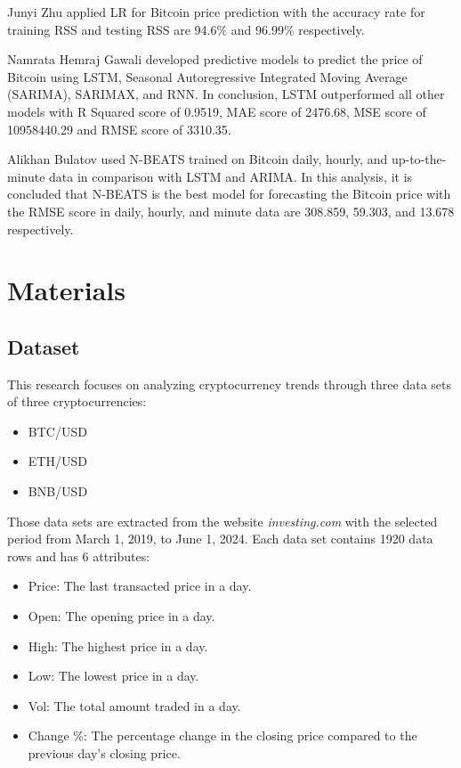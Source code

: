 \documentclass{ieeeojies}
\begin{document}
Junyi Zhu \cite{b3} applied LR for Bitcoin price prediction with the accuracy rate for training RSS and testing RSS are 94.6\% and 96.99\% respectively.\newline

Namrata Hemraj Gawali \cite{b4} developed predictive models to predict the price of Bitcoin using LSTM, Seasonal Autoregressive Integrated Moving Average (SARIMA), SARIMAX, and RNN. In conclusion, LSTM outperformed all other models with R Squared score of 0.9519, MAE score of 2476.68, MSE score of 10958440.29 and RMSE score of 3310.35.\newline

Alikhan Bulatov \cite{b5} used N-BEATS trained on Bitcoin daily, hourly, and up-to-the-minute data in comparison with LSTM and ARIMA. In this analysis, it is concluded that N-BEATS is the best model for forecasting the Bitcoin price with the RMSE score in daily, hourly, and minute data are 308.859, 59.303, and 13.678 respectively.\newline

\section{Materials}
\subsection{Dataset}
This research focuses on analyzing cryptocurrency trends through three data sets of three cryptocurrencies:
\begin{itemize}
	\item BTC/USD
	\item ETH/USD
	\item BNB/USD
\end{itemize}
Those data sets are extracted from the website \textit{investing.com} with the selected period from March 1, 2019, to June 1, 2024. 
Each data set contains 1920 data rows and has 6 attributes:
\begin{itemize}
	\item Price: The last transacted price in a day.
	\item Open: The opening price in a day.
	\item High: The highest price in a day.
	\item Low: The lowest price in a day.
	\item Vol: The total amount traded in a day.
	\item Change \%: The percentage change in the closing price compared to the previous day’s closing price.
\end{itemize}
\end{document}
